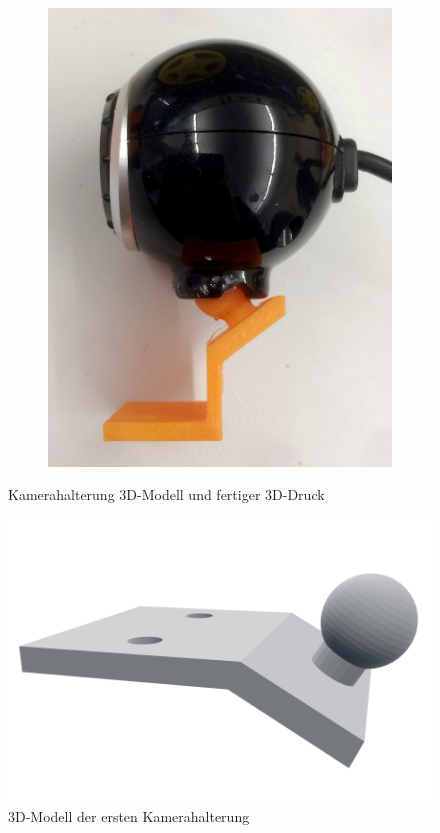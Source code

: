 \documentclass[a4paper, 12pt]{scrartcl}
\begin{document}
\begin{figure}[H]
\begin{subfigure}{.33\textwidth}
		\includegraphics[width=\textwidth]{../bilder_videos/Kamerahalterung.png}
	\end{subfigure}%
	\caption{Kamerahalterung 3D-Modell und fertiger 3D-Druck}
	\label{kamerahalterung}
\end{figure}

\begin{figure}[H]
	\centering
	\includegraphics[width=.5\textwidth]{../3D-Druck_Modelle/Kamerahalterung_alt.png}
	\caption{3D-Modell der ersten Kamerahalterung}
	\label{kamerahalterung alt}
\end{figure}
\end{document}
